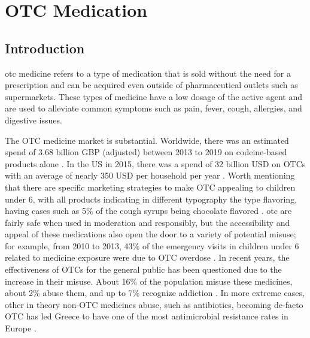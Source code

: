 \chapter{OTC Medication}
\label{ch:otc}

\section{Introduction}

\gls{otc} medicine \cite{Algarni2021} refers to a type of medication that is sold without the need for a prescription and can be acquired even outside of pharmaceutical outlets such as supermarkets. These types of medicine have a low dosage of the active agent and are used to alleviate common symptoms such as pain, fever, cough, allergies, and digestive issues.

The OTC medicine market is substantial. Worldwide, there was an estimated spend of 3.68 billion GBP (adjusted) between 2013 to 2019 on codeine-based products alone \cite{Richards2022}. In the US in 2015, there was a spend of 32 billion USD on OTCs with an average of nearly 350 USD per household per year \cite{Basch2016}. Worth mentioning that there are specific marketing strategies to make OTC appealing to children under 6, with all products indicating in different typography the type flavoring, having cases such as 5\% of the cough syrups being chocolate flavored \cite{Basch2016}. \gls{otc} are fairly safe when used in moderation and responsibly, but the accessibility and appeal of these medications also open the door to a variety of potential misuse; for example, from 2010 to 2013, 43\% of the emergency visits in children under 6 related to medicine exposure were due to OTC overdose \cite{Basch2016}. In recent years, the effectiveness of OTCs for the general public has been questioned \cite{McCoul2019} due to the increase in their misuse. About 16\% of the population misuse these medicines, about 2\% abuse them, and up to 7\% recognize addiction \cite{Algarni2021, ijerph18115530, PolandSelfMedicate, Lein2023}. In more extreme cases, other in theory non-OTC medicines abuse, such as antibiotics, becoming de-facto OTC has led Greece to have one of the most antimicrobial resistance rates in Europe \cite{Lionis2014}.

